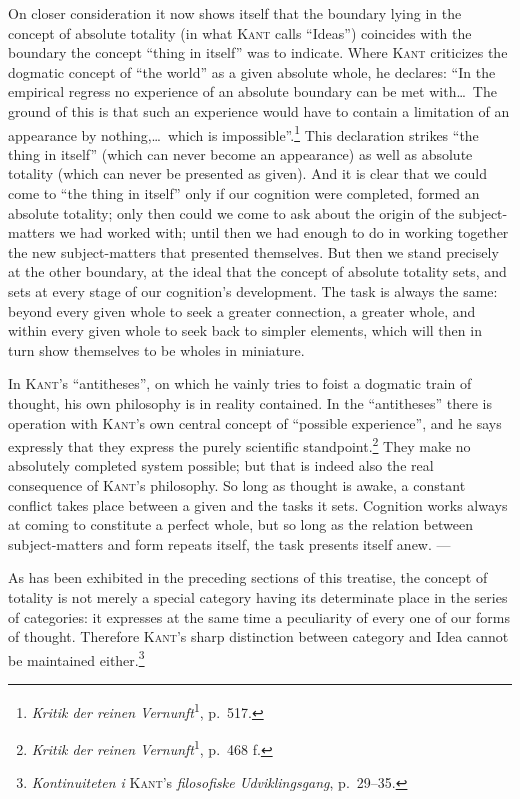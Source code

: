 \documentclass[12pt]{book}
\newcommand{\opage}[1]{\marginnote{\footnotesize\textit{[#1]}}}
\begin{document}
On closer consideration it now shows itself that the boundary lying in the concept of
absolute totality (in what \textsc{Kant} calls ``Ideas'') coincides with the boundary the
concept ``thing in itself'' was to indicate. Where \textsc{Kant} criticizes the dogmatic
concept of ``the world'' as a given absolute whole, he declares: ``In the empirical
regress no experience of an absolute boundary can be met with\dots\ The ground of this is
that such an experience would have to contain a limitation of an \opage{75}appearance by
nothing,\dots\ which is impossible''.\footnote{\textit{Kritik der reinen
Vernunft}\textsuperscript{1}, p.\ 517.} This declaration strikes ``the thing in itself''
(which can never become an appearance) as well as absolute totality (which can never be
presented as given). And it is clear that we could come to ``the thing in itself'' only
if our cognition were completed, formed an absolute totality; only then could we come to
ask about the origin of the subject-matters we had worked with; until then we had enough
to do in working together the new subject-matters that presented themselves. But then we
stand precisely at the other boundary, at the ideal that the concept of absolute totality
sets, and sets at every stage of our cognition's development. The task is always the
same: beyond every given whole to seek a greater connection, a greater whole, and within
every given whole to seek back to simpler elements, which will then in turn show
themselves to be wholes in miniature.

In \textsc{Kant}'s ``antitheses'', on which he vainly tries to foist a dogmatic train of
thought, his own philosophy is in reality contained. In the ``antitheses'' there is
operation with \textsc{Kant}'s own central concept of ``possible experience'', and he says
expressly that they express the purely scientific
standpoint.\footnote{\textit{Kritik der reinen Vernunft}\textsuperscript{1}, p.\ 468 f.}
They make no absolutely completed system possible; but that is indeed also the real
consequence of \textsc{Kant}'s philosophy. So long as thought is awake, a constant
conflict takes place between a given and the tasks it sets. Cognition works always at
coming to constitute a perfect whole, but so long as the relation between subject-matters
and form repeats itself, the task presents itself anew. ---

As has been exhibited in the preceding sections of this treatise, the concept of totality
is not merely a special category having its determinate place in the series of categories:
it expresses at the same time a peculiarity of every one of our forms of thought. Therefore
\textsc{Kant}'s sharp distinction between category and Idea cannot be maintained
either.\footnote{\textit{Kontinuiteten i} \textsc{Kant}'s \textit{filosofiske
Udviklingsgang}, p.\ 29--35.}
\end{document}
